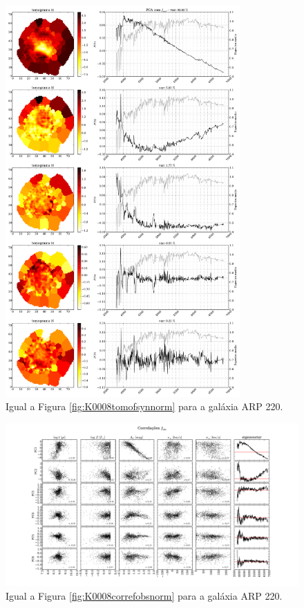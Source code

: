\begin{figure}
    \includegraphics[width=0.8\textwidth]{figuras/K0802-tomo-syn-norm.pdf}
    \caption[Tomogramas de 1 a 5 para o cubo $f_{obs}$ - ARP 220.]
    {Igual a Figura \ref{fig:K0008tomofsynnorm} para a galáxia ARP 220.}
    \label{fig:K0802tomofsynnorm}
\end{figure}

\begin{figure}
    \includegraphics[width=1.3\textwidth, angle=-90]{figuras/K0802-correl-f_obs_norm-PCvsPhys.pdf}
	\caption[Correlações PCs vs. par\^ametros f\'isicos - $f_{obs}$ - ARP 220.]
	{Igual a Figura \ref{fig:K0008correfobsnorm} para a galáxia ARP 220.}
    \label{fig:K0802correfobsnorm}
\end{figure}

